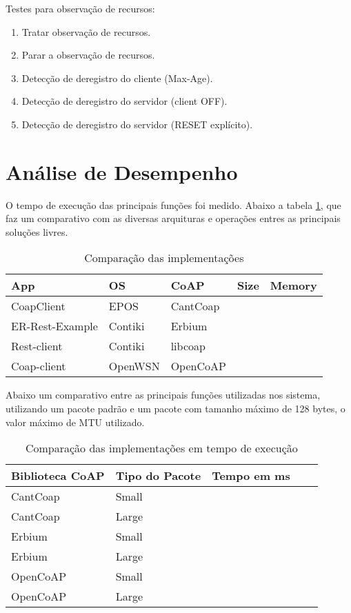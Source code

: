 Testes para observa\c{c}\~ao de recursos:
\begin{enumerate}
    \item Tratar observa\c{c}\~ao de recursos.
    \item Parar a observa\c{c}\~ao de recursos.
    \item Detec\c{c}\~ao de deregistro do cliente (Max-Age).
    \item Detec\c{c}\~ao de deregistro do servidor (client OFF).
    \item Detec\c{c}\~ao de deregistro do servidor (RESET expl\'icito).
\end{enumerate}

\section{An\'alise de Desempenho}



O tempo de execu\c{c}\~ao das principais fun\c{c}\~oes foi medido. Abaixo a tabela \ref{comparacaoCoap}, que faz um comparativo com as diversas arquituras e opera\c{c}\~oes entres as principais solu\c{c}\~oes livres.

\begin{table}[h]
\label{comparacaoCoap}
\centering
\begin{tabular}{@{}lllll@{}}
\toprule
  App & OS & CoAP & Size &  Memory & \\ \midrule
  CoapClient & EPOS &  CantCoap &  &  & \\
  ER-Rest-Example & Contiki &  Erbium & & & \\
  Rest-client & Contiki &  libcoap & & & \\
  Coap-client & OpenWSN &  OpenCoAP &  & & \\ \bottomrule
\end{tabular}
\caption{Compara\c{c}\~ao das implementa\c{c}\~oes}
\end{table}

Abaixo um comparativo entre as principais fun\c{c}\~oes utilizadas nos sistema, utilizando um pacote padr\~ao e um pacote com tamanho m\'aximo de 128 bytes, o valor m\'aximo de MTU utilizado.

\begin{table}[h]
\label{executionTimeCoap}
\centering
\begin{tabular}{@{}lllll@{}}
\toprule
Biblioteca CoAP & Tipo do Pacote & Tempo em ms &  \\ \midrule
CantCoap &  Small &  & \\
CantCoap &  Large &  & \\
Erbium &  Small &  &  \\
Erbium &  Large &  &  \\
OpenCoAP &  Small &  &  \\
OpenCoAP &  Large &  &  \\ \bottomrule
\end{tabular}
\caption{Compara\c{c}\~ao das implementa\c{c}\~oes em tempo de execu\c{c}\~ao}
\end{table}

